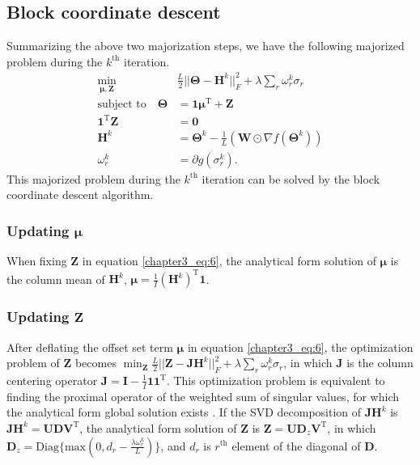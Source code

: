 \subsection{Block coordinate descent}
Summarizing the above two majorization steps, we have the following majorized problem during the $k^{\text{th}}$ iteration.
\begin{equation}\label{chapter3_eq:6}
\begin{aligned}
\min_{\bm{\mu},\mathbf{Z}} \quad & \frac{L}{2}||\mathbf{\Theta}-\mathbf{H}^{k}||_F^2 + \lambda \sum_{r} \omega_r^k\sigma_{r}\\
           \text{subject to} \quad   \mathbf{\Theta} &= \mathbf{1}\bm{\mu}^{\text{T}} + \mathbf{Z}\\
                               \mathbf{1}^{\text{T}}\mathbf{Z} &= \mathbf{0} \\
                                \mathbf{H}^k &= \mathbf{\Theta}^k - \frac{1}{L} (\mathbf{W}\odot \nabla f(\mathbf{\Theta}^k)) \\
                               \omega_r^k &= \partial g(\sigma_r^k).
\end{aligned}
\end{equation}
This majorized problem during the $k^{\text{th}}$ iteration can be solved by the block coordinate descent algorithm.

\subsubsection*{Updating $\bm{\mu}$}
When fixing $\mathbf{Z}$ in equation \ref{chapter3_eq:6}, the analytical form solution of $\bm{\mu}$ is the column mean of $\mathbf{H}^k$, $\bm{\mu} = \frac{1}{I} (\mathbf{H}^k)^{\text{T}} \mathbf{1}$.

\subsubsection*{Updating $\mathbf{Z}$}
After deflating the offset set term $\bm{\mu}$ in equation \ref{chapter3_eq:6}, the optimization problem of $\mathbf{Z}$ becomes $\min_{\mathbf{Z}} \frac{L}{2}||\mathbf{Z}-\mathbf{J}\mathbf{H}^k||_F^2 + \lambda \sum_{r} \omega_r^k\sigma_{r}$, in which $\mathbf{J}$ is the column centering operator $\mathbf{J} = \mathbf{I} - \frac{1}{I}\mathbf{11}^{\text{T}}$. This optimization problem is equivalent to finding the proximal operator of the weighted sum of singular values, for which the analytical form global solution exists \cite{lu2015generalized}. If the SVD decomposition of $\mathbf{J}\mathbf{H}^k$ is $\mathbf{J}\mathbf{H}^k = \mathbf{UDV}^{\text{T}}$, the analytical form solution of $\mathbf{Z}$ is $\mathbf{Z} = \mathbf{U}\mathbf{D}_{z} \mathbf{V}^{\text{T}}$, in which $\mathbf{D}_{z} = \text{Diag}\{\text{max}(0, d_{r}-\frac{\lambda \omega_r^k}{L}) \}$, and $d_{r}$ is $r^{\text{th}}$ element of the diagonal of $\mathbf{D}$.

